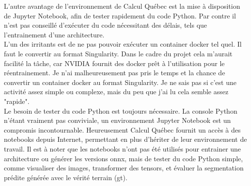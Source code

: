 \noindent L'autre avantage de l'environnement de Calcul Québec est la mise à disposition de Jupyter Notebook, afin de tester rapidement du code Python. Par contre il n'est pas conseillé d'exécuter du code nécessitant des délais, tels que l'entrainement d'une architecture. 
\vspace{0.5\baselineskip}
\\
\noindent L'un des irritants est de ne pas pouvoir exécuter un container docker tel quel. Il faut le convertir au format Singularity. Dans le cadre du projet cela m'aurait facilité la tâche, car NVIDIA fournit des docker prêt à l'utilisation pour le réentrainement. Je n'ai malheureusement pas pris le temps et la chance de convertir un container docker au format Singularity. Je ne sais pas si c'est une activité assez simple ou complexe, mais du peu que j'ai lu cela semble assez "rapide".
\vspace{0.5\baselineskip}
\\
\noindent Le besoin de tester du code Python est toujours nécessaire. La console Python n'étant vraiment pas conviviale, un environnement Jupyter Notebook est un compromis incontournable. Heureusement Calcul Québec fournit un accès à des notebooks depuis Internet, permettant en plus d'hériter de leur environnement de travail. Il est à noter que les notebooks n'ont pas été utilisés pour entrainer une architecture ou générer les versions \acrshort{onnx}, mais de tester du code Python simple, comme visualiser des images, transformer des tensors, et évaluer la segmentation prédite générée avec le vérité terrain (\acrshort{gt}). 
